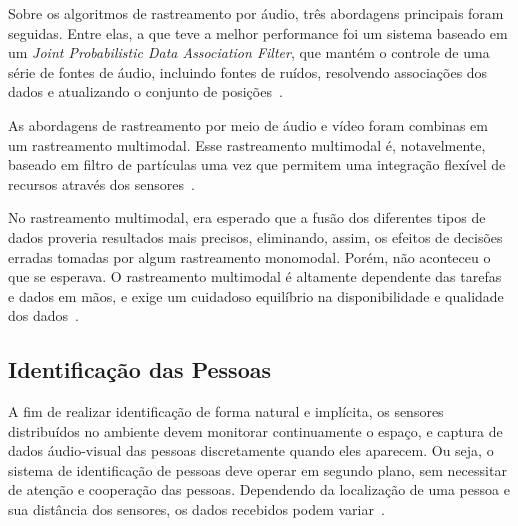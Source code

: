 	

Sobre os algoritmos de rastreamento por áudio, três abordagens principais foram seguidas. Entre elas, a que teve a melhor performance foi um sistema baseado em um \textit{Joint Probabilistic Data Association Filter}, que mantém o controle de uma série de fontes de áudio, incluindo fontes de ruídos, resolvendo associações dos dados e atualizando o conjunto de posições~\cite{chil}.

As abordagens de rastreamento por meio de áudio e vídeo foram combinas em um rastreamento multimodal. Esse rastreamento multimodal é, notavelmente, baseado em filtro de partículas uma vez que permitem uma integração flexível de recursos através dos sensores~\cite{chil}.

No rastreamento multimodal, era esperado que a fusão dos diferentes tipos de dados proveria resultados mais precisos, eliminando, assim, os efeitos de decisões erradas tomadas por algum rastreamento monomodal. Porém, não aconteceu o que se esperava. O rastreamento multimodal é altamente dependente das tarefas e dados em mãos, e exige um cuidadoso equilíbrio na disponibilidade e qualidade dos dados~\cite{chil}.

\subsection{Identificação das Pessoas}


A fim de realizar identificação de forma natural e implícita, os sensores distribuídos no ambiente devem monitorar continuamente o espaço, e captura de dados áudio-visual das pessoas discretamente quando eles aparecem. Ou seja, o sistema de identificação de pessoas
deve operar em segundo plano, sem necessitar de atenção e cooperação das pessoas. Dependendo da localização de uma pessoa e sua distância dos sensores, os dados recebidos podem variar~\cite{chil}. 

